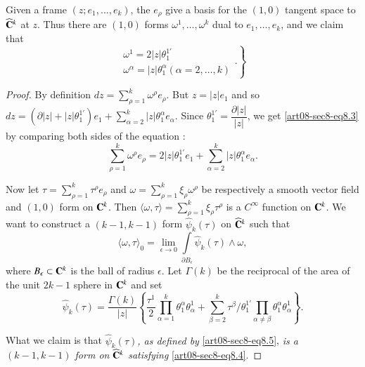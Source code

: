 Given a frame $(z;e_{1},\ldots,e_{k})$, the $e_{\rho}$ give a basis for the $(1,0)$ tangent space to $\widehat{\mathbf{C}}^{k}$ at $z$. Thus there are $(1,0)$ forms $\omega^{1},\ldots,\omega^{k}$ dual to $e_{1},\ldots,e_{k}$, and we claim that
\begin{equation*}
\left.
\begin{array}{l}
\omega^{1}=2|z|\theta^{1'}_{1}\\
\omega^{\alpha}=|z|\theta^{\alpha}_{1}(\alpha=2,\ldots,k)
\end{array}.\tag{8.3}\label{art08-sec8-eq8.3}
\right\}
\end{equation*}

\begin{proof}
By definition $dz=\sum\limits^{k}_{\rho=1}\omega^{\rho}e_{\rho}$. But $z=|z|e_{1}$ and so $dz=(\partial |z|+|z|\theta^{1'}_{1})e_{1}+\sum\limits^{k}_{\alpha=2}|z|\theta^{\alpha}_{1}e_{\alpha}$. Since $\theta^{1'}_{1}=\dfrac{\partial|z|}{|z|}$, we get \eqref{art08-sec8-eq8.3} by comparing both sides of the equation :
$$
\sum\limits^{k}_{\rho=1}\omega^{\rho}e_{\rho}=2|z|\theta^{1'}_{1}e_{1}+\sum\limits^{k}_{\alpha=2}|z|\theta^{\alpha}_{1}e_{\alpha}.
$$

Now let $\tau=\sum\limits^{k}_{\rho=1}\tau^{\rho}e_{\rho}$ and $\omega=\sum\limits^{k}_{\rho=1}\xi_{\rho}\omega^{\rho}$ be respectively a smooth vector field and $(1,0)$ form on $\mathbf{C}^{k}$. Then $\langle \omega,\tau\rangle=\sum\limits^{k}_{\rho=1}\xi_{\rho}\tau^{\rho}$ is a $C^{\infty}$ function on $\mathbf{C}^{k}$. We want to construct a $(k-1,k-1)$ form $\widehat{\psi}_{k}(\tau)$ on $\widehat{\mathbf{C}}^{k}$ such that
\begin{equation*}
\langle \omega,\tau\rangle_{0}=\lim\limits_{\epsilon\to 0}\int\limits_{\partial B_{\epsilon}}\widehat{\psi}_{k}(\tau)\wedge \omega,\tag{8.4}\label{art08-sec8-eq8.4}
\end{equation*}
where $B_{\epsilon}\subset \mathbf{C}^{k}$ is the ball of radius $\epsilon$. Let $\Gamma(k)$ be the reciprocal of the area of the unit $2k-1$ sphere in $\mathbf{C}^{k}$ and set 
\begin{equation*}
\widehat{\psi}_{k}(\tau)=\dfrac{\Gamma(k)}{|z|}\left\{\dfrac{\tau^{1}}{2}\prod\limits^{k}_{\alpha=1}\theta^{\alpha}_{1}\theta^{1}_{\alpha}+\sum\limits^{k}_{\beta=2}\tau^{\beta}/\theta^{1'}_{1}\prod\limits_{\alpha\neq \beta}\theta^{\alpha}_{1}\theta^{1}_{\alpha}\right\}.\tag{8.5}\label{art08-sec8-eq8.5}
\end{equation*}

What we claim is that {\em $\widehat{\psi}_{k}(\tau)$, as defined by} \eqref{art08-sec8-eq8.5}, {\em is a $(k-1,k-1)$ form on $\widehat{\mathbf{C}}^{k}$ satisfying} \eqref{art08-sec8-eq8.4}. 
\end{proof}

